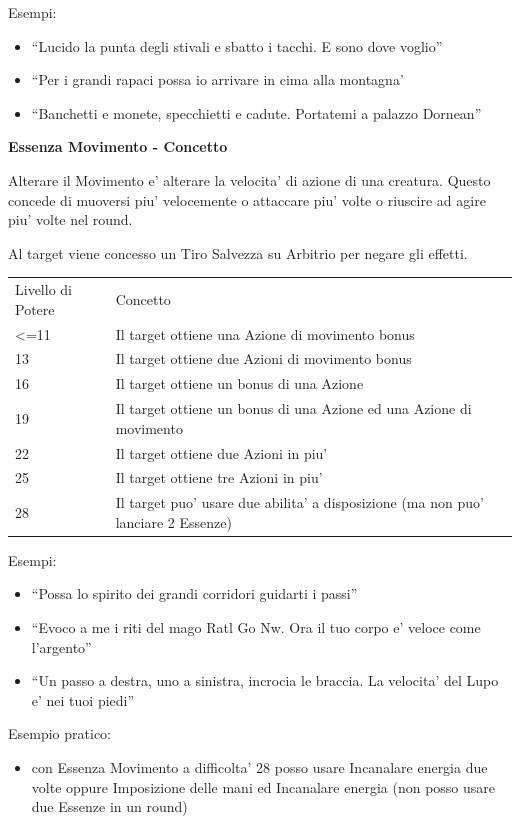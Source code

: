 \documentclass[a4paper,11pt,twoside,openany]{dndbook}
\begin{document}
\bigskip

Esempi:
\begin{itemize}
\item 
``Lucido la punta degli stivali e sbatto i tacchi. E sono dove voglio'' 
\item 
``Per i grandi rapaci possa io arrivare in cima alla montagna' 
\item 
``Banchetti e monete, specchietti e cadute. Portatemi a palazzo Dornean'' 
\end{itemize}

\bigskip

\textbf{Essenza Movimento - Concetto}

Alterare il Movimento e' alterare la velocita' di azione di una creatura.
Questo concede di muoversi piu' velocemente o attaccare piu' volte o riuscire ad agire piu' volte nel round.

Al target viene concesso un Tiro Salvezza su Arbitrio per negare gli effetti.

\bigskip

\begin{tabular}[c]{@{}ll@{}}
\toprule 
Livello di Potere & Concetto\tabularnewline
\textless=11 & Il target ottiene una Azione di movimento bonus\tabularnewline
13 & Il target ottiene due Azioni di movimento bonus\tabularnewline
16 & Il target ottiene un bonus di una Azione\tabularnewline
19 & Il target ottiene un bonus di una Azione ed una Azione di movimento\tabularnewline
22 & Il target ottiene due Azioni in piu'\tabularnewline
25 & Il target ottiene tre Azioni in piu'\tabularnewline
28 & Il target puo' usare due abilita' a disposizione (ma non puo' lanciare
2 Essenze)\tabularnewline
\bottomrule
\end{tabular}

\bigskip

Esempi:
\begin{itemize}
\item 
``Possa lo spirito dei grandi corridori guidarti i passi'' 
\item 
``Evoco a me i riti del mago Ratl Go Nw. Ora il tuo corpo e' veloce
come l'argento'' 
\item 
``Un passo a destra, uno a sinistra, incrocia le braccia. La velocita' del Lupo e' nei tuoi piedi'' 
\end{itemize}
Esempio pratico:
\begin{itemize}
\item 
con Essenza Movimento a difficolta' 28 posso usare Incanalare energia due volte oppure Imposizione delle mani ed Incanalare energia (non posso usare due Essenze in un round) 
\end{itemize}
\end{document}
